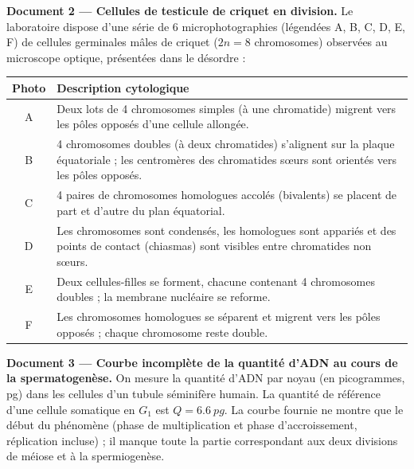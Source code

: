 \documentclass[11pt]{article}
\begin{document}
\textbf{Document 2 --- Cellules de testicule de criquet en division.} Le laboratoire dispose d'une série de 6 microphotographies (légendées A, B, C, D, E, F) de cellules germinales mâles de criquet ($2n = 8$ chromosomes) observées au microscope optique, présentées dans le désordre :

\begin{center}
\begin{tabularx}{\linewidth}{|c|X|}\hline
\rowcolor{popblueL}\textbf{Photo} & \textbf{Description cytologique} \\ \hline
A & Deux lots de 4 chromosomes simples (à une chromatide) migrent vers les pôles opposés d'une cellule allongée. \\ \hline
B & 4 chromosomes doubles (à deux chromatides) s'alignent sur la plaque équatoriale ; les centromères des chromatides sœurs sont orientés vers les pôles opposés. \\ \hline
C & 4 paires de chromosomes homologues accolés (bivalents) se placent de part et d'autre du plan équatorial. \\ \hline
D & Les chromosomes sont condensés, les homologues sont appariés et des points de contact (chiasmas) sont visibles entre chromatides non sœurs. \\ \hline
E & Deux cellules-filles se forment, chacune contenant 4 chromosomes doubles ; la membrane nucléaire se reforme. \\ \hline
F & Les chromosomes homologues se séparent et migrent vers les pôles opposés ; chaque chromosome reste double. \\ \hline
\end{tabularx}
\end{center}

\textbf{Document 3 --- Courbe incomplète de la quantité d'ADN au cours de la spermatogenèse.} On mesure la quantité d'ADN par noyau (en picogrammes, pg) dans les cellules d'un tubule séminifère humain. La quantité de référence d'une cellule somatique en $G_1$ est $Q = \SI{6,6}{pg}$. La courbe fournie ne montre que le début du phénomène (phase de multiplication et phase d'accroissement, réplication incluse) ; il manque toute la partie correspondant aux deux divisions de méiose et à la spermiogenèse.
\end{document}
